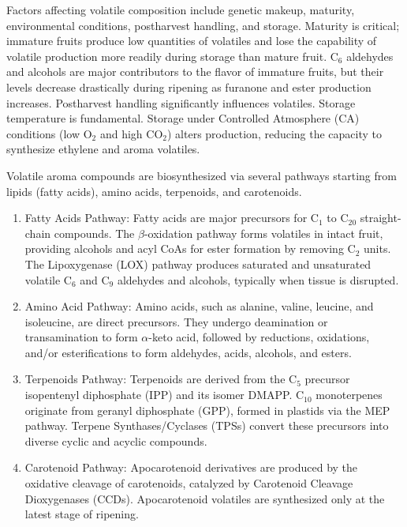 \vspace{0.5em}
Factors affecting volatile composition include genetic makeup, maturity, environmental conditions, postharvest handling, and storage. Maturity is critical; immature fruits produce low quantities of volatiles and lose the capability of volatile production more readily during storage than mature fruit. C$_6$ aldehydes and alcohols are major contributors to the flavor of immature fruits, but their levels decrease drastically during ripening as furanone and ester production increases. Postharvest handling significantly influences volatiles. Storage temperature is fundamental. Storage under Controlled Atmosphere (CA) conditions (low O$_2$ and high CO$_2$) alters production, reducing the capacity to synthesize ethylene and aroma volatiles.

\vspace{0.5em}
Volatile aroma compounds are biosynthesized via several pathways starting from lipids (fatty acids), amino acids, terpenoids, and carotenoids. 

\begin{enumerate} 
    \item Fatty Acids Pathway: Fatty acids are major precursors for C$_1$ to C$_{20}$ straight-chain compounds. The $\beta$-oxidation pathway forms volatiles in intact fruit, providing alcohols and acyl CoAs for ester formation by removing C$_2$ units. The Lipoxygenase (LOX) pathway produces saturated and unsaturated volatile C$_6$ and C$_9$ aldehydes and alcohols, typically when tissue is disrupted. 
    \item Amino Acid Pathway: Amino acids, such as alanine, valine, leucine, and isoleucine, are direct precursors. They undergo deamination or transamination to form $\alpha$-keto acid, followed by reductions, oxidations, and/or esterifications to form aldehydes, acids, alcohols, and esters. 
    \item Terpenoids Pathway: Terpenoids are derived from the C$_5$ precursor isopentenyl diphosphate (IPP) and its isomer DMAPP. C$_10$ monoterpenes originate from geranyl diphosphate (GPP), formed in plastids via the MEP pathway. Terpene Synthases/Cyclases (TPSs) convert these precursors into diverse cyclic and acyclic compounds. 
    \item Carotenoid Pathway: Apocarotenoid derivatives are produced by the oxidative cleavage of carotenoids, catalyzed by Carotenoid Cleavage Dioxygenases (CCDs). Apocarotenoid volatiles are synthesized only at the latest stage of ripening. 
\end{enumerate}


